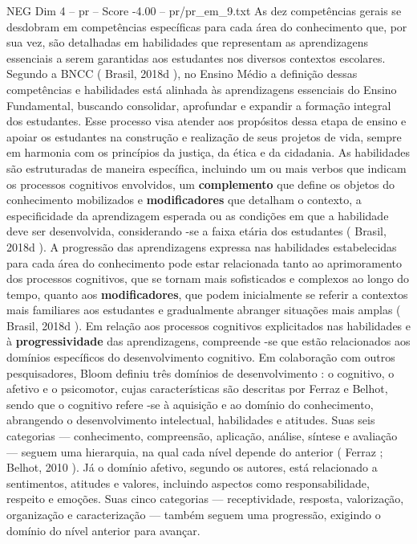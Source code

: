 \begin{textsample}{NEG Dim 4 – pr – Score -4.00 – pr/pr\_em\_9.txt}  \label{ex:f4_neg_102}
As dez competências gerais se desdobram em competências específicas para cada área do conhecimento que, por sua vez, são detalhadas em habilidades que representam as aprendizagens essenciais a serem garantidas aos estudantes nos diversos contextos escolares.
Segundo a BNCC ( Brasil, 2018d ), no Ensino Médio a definição dessas competências e habilidades está alinhada às aprendizagens essenciais do Ensino Fundamental, buscando consolidar, aprofundar e expandir a formação integral dos estudantes.
Esse processo visa atender aos propósitos dessa etapa de ensino e apoiar os estudantes na construção e realização de seus projetos de vida, sempre em harmonia com os princípios da justiça, da ética e da cidadania.
As habilidades são estruturadas de maneira específica, incluindo um ou mais verbos que indicam os processos cognitivos envolvidos, um \textbf{complemento} que define os objetos do conhecimento mobilizados e \textbf{modificadores} que detalham o contexto, a especificidade da aprendizagem esperada ou as condições em que a habilidade deve ser desenvolvida, considerando -se a faixa etária dos estudantes ( Brasil, 2018d ).
A progressão das aprendizagens expressa nas habilidades estabelecidas para cada área do conhecimento pode estar relacionada tanto ao aprimoramento dos processos cognitivos, que se tornam mais sofisticados e complexos ao longo do tempo, quanto aos \textbf{modificadores}, que podem inicialmente se referir a contextos mais familiares aos estudantes e gradualmente abranger situações mais amplas ( Brasil, 2018d ).
Em relação aos processos cognitivos explicitados nas habilidades e à \textbf{progressividade} das aprendizagens, compreende -se que estão relacionados aos domínios específicos do desenvolvimento cognitivo.
Em colaboração com outros pesquisadores, Bloom definiu três domínios de desenvolvimento : o cognitivo, o afetivo e o psicomotor, cujas características são descritas por Ferraz e Belhot, sendo que o cognitivo refere -se à aquisição e ao domínio do conhecimento, abrangendo o desenvolvimento intelectual, habilidades e atitudes.
Suas seis categorias — conhecimento, compreensão, aplicação, análise, síntese e avaliação — seguem uma hierarquia, na qual cada nível depende do anterior ( Ferraz ; Belhot, 2010 ).
Já o domínio afetivo, segundo os autores, está relacionado a sentimentos, atitudes e valores, incluindo aspectos como responsabilidade, respeito e emoções.
Suas cinco categorias — receptividade, resposta, valorização, organização e caracterização — também seguem uma progressão, exigindo o domínio do nível anterior para avançar.

\end{textsample}
